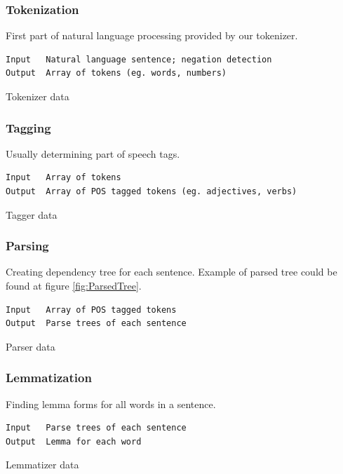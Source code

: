 \subsubsection{Tokenization}
First part of natural language processing provided by our tokenizer.
\begin{table}[ht]   %
\begin{center}
    \begin{verbatim}
Input 	Natural language sentence; negation detection
Output 	Array of tokens (eg. words, numbers) 
        \end{verbatim}
  \caption{Tokenizer data}
  \label{tab.tokenization}
\end{center}
\end{table} 

\subsubsection{Tagging}
Usually determining part of speech tags.
\begin{table}[ht]   %
\begin{center}
    \begin{verbatim}
Input 	Array of tokens
Output 	Array of POS tagged tokens (eg. adjectives, verbs) 
        \end{verbatim}
  \caption{Tagger data}
  \label{tab.tagging}
\end{center}
\end{table} 

\subsubsection{Parsing}
Creating dependency tree for each sentence. Example of parsed tree could be found at figure \ref{fig:ParsedTree}. 

\begin{table}[ht]   %
\begin{center}
    \begin{verbatim}
Input 	Array of POS tagged tokens
Output 	Parse trees of each sentence 
        \end{verbatim}
  \caption{Parser data}
  \label{tab.parsing}
\end{center}
\end{table}  

\subsubsection{Lemmatization}
Finding lemma forms for all words in a sentence.
\begin{table}[ht]   %
\begin{center}
    \begin{verbatim}
Input 	Parse trees of each sentence
Output 	Lemma for each word 
        \end{verbatim}
  \caption{Lemmatizer data}
  \label{tab.lemmatizer}
\end{center}
\end{table} 

